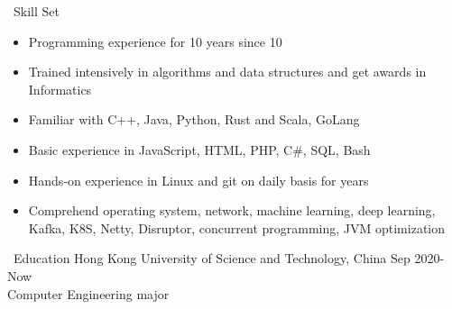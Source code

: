 \documentclass{resume}
\begin{document}

\begin{rSection}{\faCogs~Skill Set}
    \begin{itemize}
        \itemsep -0.5em
        \item Programming experience for 10 years since 10
        \item Trained intensively in algorithms and data structures and get awards in Informatics
        \item Familiar with C++, Java, Python, Rust and Scala, GoLang
        \item Basic experience in JavaScript, HTML, PHP, C\#, SQL, Bash
        \item Hands-on experience in Linux and git on daily basis for years
        \item Comprehend operating system, network, machine learning, deep learning, Kafka, K8S, Netty, Disruptor, concurrent programming, JVM optimization
    \end{itemize}
    
\end{rSection}

\begin{rSection}{\faGraduationCap~Education}
    Hong Kong University of Science and Technology, China \hfill Sep 2020-Now \\ Computer Engineering major
\end{rSection}
\end{document}
